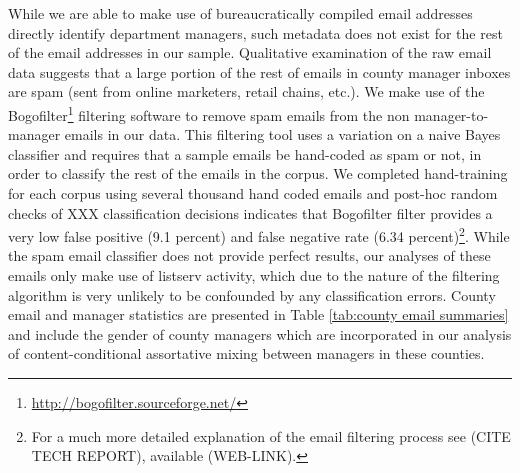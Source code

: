 \documentclass[fleqn]{MJDArticle}
\begin{document}
While we are able to make use of bureaucratically compiled email addresses directly identify department managers, such metadata does not exist for the rest of the email addresses in our sample. Qualitative examination of the raw email data suggests that a large portion of the rest of emails in county manager inboxes are spam (sent from online marketers, retail chains, etc.). We make use of the Bogofilter\footnote{\href{http://bogofilter.sourceforge.net/}{http://bogofilter.sourceforge.net/}} filtering software to remove spam emails from the non manager-to-manager emails in our data. This filtering tool uses a variation on a naive Bayes classifier and requires that a sample emails be hand-coded as spam or not, in order to classify the rest of the emails in the corpus. We completed hand-training for each corpus using several thousand hand coded emails and post-hoc random checks of XXX classification decisions indicates that Bogofilter filter provides a very low false positive (9.1 percent) and  false negative rate (6.34 percent)\footnote{For a much more detailed explanation of the email filtering process see (CITE TECH REPORT), available (WEB-LINK).}. While the spam email classifier does not provide perfect results, our analyses of these emails only make use of listserv activity, which due to the nature of the filtering algorithm is very unlikely to be confounded by any classification errors. County email and manager statistics are presented in Table \ref{tab:county email summaries} and include the gender of county managers which are incorporated in our analysis of content-conditional assortative mixing between managers in these counties.  
\end{document}
